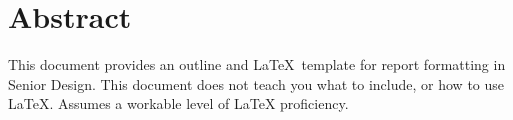 \section*{Abstract} %

This document provides an outline and \LaTeX\ template for report formatting in Senior Design. This document does not teach you what to include, or how to use LaTeX. Assumes a workable level of LaTeX proficiency.